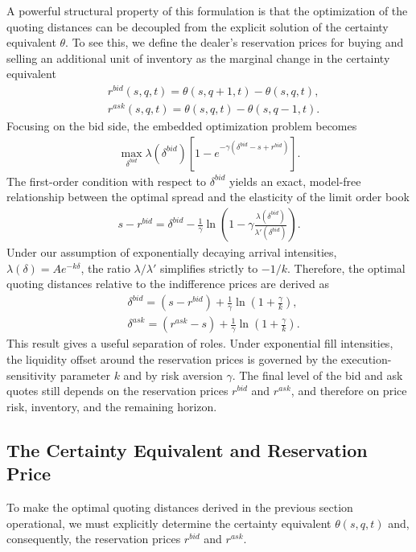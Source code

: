 A powerful structural property of this formulation is that the optimization of the quoting distances can be decoupled from the explicit solution of the certainty equivalent $\theta$. To see this, we define the dealer's reservation prices for buying and selling an additional unit of inventory as the marginal change in the certainty equivalent
\begin{align*}
    &r^{bid}(s,q,t) = \theta(s,q+1,t) - \theta(s,q,t),\\
    &r^{ask}(s,q,t) = \theta(s,q,t) - \theta(s,q-1,t).
\end{align*}
Focusing on the bid side, the embedded optimization problem becomes 
\begin{align*}
    \max_{\delta^{bid}} \lambda(\delta^{bid}) [1 - e^{-\gamma(\delta^{bid} - s + r^{bid})}].
\end{align*}
The first-order condition with respect to $\delta^{bid}$ yields an exact, model-free relationship between the optimal spread and the elasticity of the limit order book
\begin{align*}
    s - r^{bid} =\delta^{bid} - \frac{1}{\gamma} \ln \left( 1 - \gamma \frac{\lambda(\delta^{bid})}{\lambda'(\delta^{bid})} \right).
\end{align*}
Under our assumption of exponentially decaying arrival intensities, $\lambda(\delta) = A e^{-k\delta}$, the ratio $\lambda / \lambda'$ simplifies strictly to $-1/k$. Therefore, the optimal quoting distances relative to the indifference prices are derived as
\begin{align*}
    &\delta^{bid} = (s - r^{bid}) + \frac{1}{\gamma} \ln \left( 1 + \frac{\gamma}{k} \right),\\
    &\delta^{ask} = (r^{ask} - s) + \frac{1}{\gamma} \ln \left( 1 + \frac{\gamma}{k} \right).
\end{align*}
This result gives a useful separation of roles. Under exponential fill intensities, the liquidity offset around the reservation prices is governed by the execution-sensitivity parameter $k$ and by risk aversion $\gamma$. The final level of the bid and ask quotes still depends on the reservation prices $r^{bid}$ and $r^{ask}$, and therefore on price risk, inventory, and the remaining horizon.

\subsection{The Certainty Equivalent and Reservation Price}
To make the optimal quoting distances derived in the previous section operational, we must explicitly determine the certainty equivalent $\theta(s,q,t)$ and, consequently, the reservation prices $r^{bid}$ and $r^{ask}$. 

